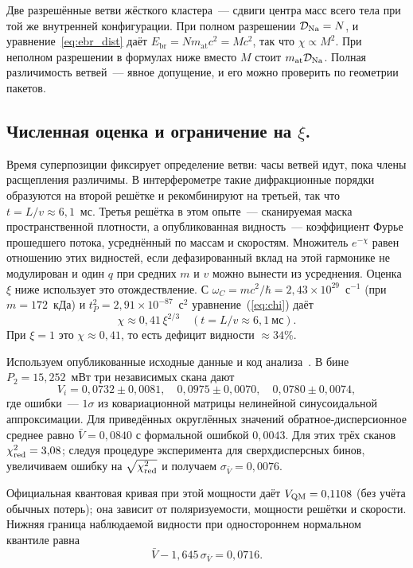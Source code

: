 \documentclass[12pt,a4paper]{article}
\begin{document}
Две разрешённые ветви жёсткого кластера~--- сдвиги центра масс всего тела при той же внутренней конфигурации. При полном разрешении $\mathcal D_{\rm Na}=N$, и уравнение~\eqref{eq:ebr_dist} даёт $E_{\mathrm{br}}=Nm_{\mathrm{at}}c^2=Mc^2$, так что $\chi\propto M^2$. При неполном разрешении в формулах ниже вместо $M$ стоит $m_{\mathrm{at}}\mathcal D_{\rm Na}$. Полная различимость ветвей~--- явное допущение, и его можно проверить по геометрии пакетов.

\subsection{Численная оценка и ограничение на $\xi$.}
\label{sec:xi_bound}
Время суперпозиции фиксирует определение ветви: часы ветвей идут, пока члены расщепления различимы. В интерферометре такие дифракционные порядки образуются на второй решётке и рекомбинируют на третьей, так что $t=L/v\approx6{,}1$~мс. Третья решётка в этом опыте~--- сканируемая маска пространственной плотности, а опубликованная видность~--- коэффициент Фурье прошедшего потока, усреднённый по массам и скоростям. Множитель $e^{-\chi}$ равен отношению этих видностей, если дефазированный вклад на этой гармонике не модулирован и один $q$ при средних $m$ и $v$ можно вынести из усреднения. Оценка $\xi$ ниже использует это отождествление. С $\omega_C=mc^2/\hbar=2{,}43\times10^{29}$~с$^{-1}$ (при $m=172$~кДа) и $t_P^2=2{,}91\times10^{-87}$~с$^2$ уравнение~(\ref{eq:chi}) даёт
\begin{equation}
\chi\approx 0{,}41\,\xi^{2/3}\quad (t=L/v\approx 6{,}1~\text{мс}).
\end{equation}
При $\xi=1$ это $\chi\approx 0{,}41$, то есть дефицит видности $\approx34\%$.

Используем опубликованные исходные данные и код анализа~\cite{arndt_data}. В бине $P_2=15{,}252$~мВт три независимых скана дают
\begin{equation}
V_i=0{,}0732\pm0{,}0081,\quad
0{,}0975\pm0{,}0070,\quad
0{,}0780\pm0{,}0074,
\end{equation}
где ошибки~--- $1\sigma$ из ковариационной матрицы нелинейной синусоидальной аппроксимации. Для приведённых округлённых значений обратное-дисперсионное среднее равно $\bar V=0{,}0840$ с формальной ошибкой $0{,}0043$. Для этих трёх сканов $\chi^2_{\rm red}=3{,}08$; следуя процедуре эксперимента для сверхдисперсных бинов, увеличиваем ошибку на $\sqrt{\chi^2_{\rm red}}$ и получаем $\sigma_{\bar V}=0{,}0076$.

Официальная квантовая кривая при этой мощности даёт $V_{\rm QM}=0{,}1108$ (без учёта обычных потерь); она зависит от поляризуемости, мощности решётки и скорости. Нижняя граница наблюдаемой видности при одностороннем нормальном квантиле равна
\begin{equation}
\bar V-1{,}645\,\sigma_{\bar V}=0{,}0716.
\end{equation}
\end{document}
